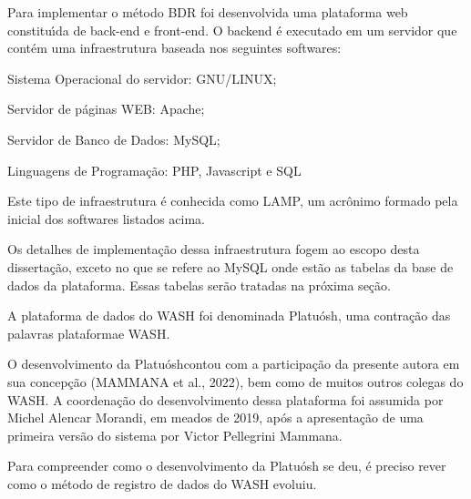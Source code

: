 \documentclass[
12pt,		%
openright,	%
twoside,  %
a4paper,			%
chapter=TITLE,		%
english,			%
french,				%
spanish,			%
brazil				%
]{USPSC-classe/USPSC}
\begin{document}
Para implementar o m\'etodo BDR foi desenvolvida uma plataforma web constitu\'{\i}da de back-end e front-end. O backend \'e executado em um servidor que cont\'em uma infraestrutura baseada nos seguintes softwares:









\begin{alineas}
\item Sistema Operacional do servidor: GNU/LINUX;
\item Servidor de p\'aginas WEB: Apache;
\item Servidor de Banco de Dados: MySQL;
\item Linguagens de Programa\c{c}\~ao: PHP, Javascript e SQL
\end{alineas}

Este tipo de infraestrutura \'e conhecida como LAMP, um acr\^onimo formado pela inicial dos softwares listados acima.








Os detalhes de implementa\c{c}\~ao dessa infraestrutura fogem ao escopo desta disserta\c{c}\~ao, exceto no que se refere ao MySQL onde est\~ao as tabelas da base de dados da plataforma. Essas tabelas ser\~ao tratadas na pr\'oxima se\c{c}\~ao.








A plataforma de dados do WASH foi denominada \textquotedbl Platu\'osh\textquotedbl , uma contra\c{c}\~ao das palavras \textquotedbl plataforma\textquotedbl  e \textquotedbl WASH\textquotedbl .








O desenvolvimento da \textquotedbl Platu\'osh\textquotedbl  contou com a participa\c{c}\~ao da presente autora em sua concep\c{c}\~ao  (MAMMANA et al., 2022), bem como de muitos outros colegas do WASH. A coordena\c{c}\~ao do desenvolvimento dessa plataforma foi assumida por Michel Alencar Morandi, em meados de 2019, ap\'os a apresenta\c{c}\~ao de uma primeira vers\~ao do sistema por Victor Pellegrini Mammana.








Para compreender como o desenvolvimento da Platu\'osh se deu, \'e preciso rever como o m\'etodo de registro de dados do WASH evoluiu.
\end{document}

